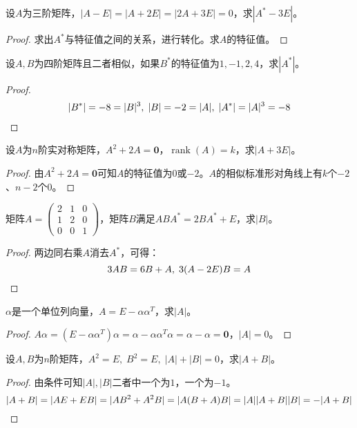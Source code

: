 \begin{theorem}
	设$A$为三阶矩阵，$|A-E|=|A+2E|=|2A+3E|=0$，求$|A^*-3E|$。
\end{theorem}
\begin{proof}
	求出$A^*$与特征值之间的关系，进行转化。求$A$的特征值。
\end{proof}
\begin{theorem}
	设$A,B$为四阶矩阵且二者相似，如果$B^*$的特征值为$1,-1,2,4$，求$|A^*|$。
\end{theorem}
\begin{proof}
	\begin{gather*}
		|B^*|=-8=|B|^3,\;|B|=-2=|A|,\;|A^*|=|A|^3=-8\qedhere
	\end{gather*}
\end{proof}
\begin{theorem}
	设$A$为$n$阶实对称矩阵，$A^2+2A=\mathbf{0}$，$\operatorname{rank}(A)=k$，求$|A+3E|$。
\end{theorem}
\begin{proof}
	由$A^2+2A=\mathbf{0}$可知$A$的特征值为$0$或$-2$。$A$的相似标准形对角线上有$k$个$-2$、$n-2$个$0$。
\end{proof}
\begin{theorem}
	矩阵$A=
	\begin{pmatrix}
		2 & 1 & 0 \\
		1 & 2 & 0 \\
		0 & 0 & 1
	\end{pmatrix}$，矩阵$B$满足$ABA^*=2BA^*+E$，求$|B|$。
\end{theorem}
\begin{proof}
	两边同右乘$A$消去$A^*$，可得：
	\begin{equation*}
		3AB=6B+A,\;3(A-2E)B=A\qedhere
	\end{equation*}
\end{proof}
\begin{theorem}
	$\alpha$是一个单位列向量，$A=E-\alpha\alpha^T$，求$|A|$。
\end{theorem}
\begin{proof}
	$A\alpha=(E-\alpha\alpha^T)\alpha=\alpha-\alpha\alpha^T\alpha=\alpha-\alpha=\mathbf{0}$，$|A|=0$。
\end{proof}
\begin{theorem}
	设$A,B$为$n$阶矩阵，$A^2=E,\;B^2=E,\;|A|+|B|=0$，求$|A+B|$。
\end{theorem}
\begin{proof}
	由条件可知$|A|,|B|$二者中一个为$1$，一个为$-1$。
	\begin{equation*}
		|A+B|=|AE+EB|=|AB^2+A^2B|=|A(B+A)B|=|A||A+B||B|=-|A+B|\qedhere
	\end{equation*}
\end{proof}

